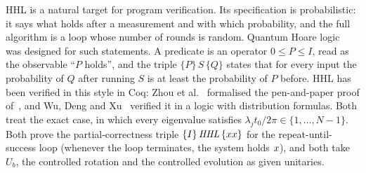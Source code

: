 \documentclass[runningheads]{llncs}
\let\ket\relax\let\bra\relax\let\braket\relax\let\ketbra\relax
\newcommand{\ket}[1]{|#1\rangle}
\newcommand{\bra}[1]{\langle #1|}
\newcommand{\braket}[2]{\langle #1|#2\rangle}
\newcommand{\ketbra}[2]{|#1\rangle\langle #2|}
\begin{document}
HHL is a natural target for program verification. Its specification is probabilistic: it says what
holds after a measurement and with which probability, and the full algorithm is a loop whose number of
rounds is random. Quantum Hoare logic~\cite{ying2011,dhondt2006} was designed for such statements. A
predicate is an operator $0\le P\le I$, read as the observable ``$P$ holds'', and the triple
$\{P\}\,S\,\{Q\}$ states that for every input the probability of $Q$ after running $S$ is at least the
probability of $P$ before. HHL has been verified in this style in Coq: Zhou et al.~\cite{zhou2023coqq}
formalised the pen-and-paper proof of~\cite{zhou2019applied}, and Wu, Deng and Xu~\cite{wu2024local}
verified it in a logic with distribution formulas. Both treat the exact case, in which every
eigenvalue satisfies $\lambda_jt_0/2\pi\in\{1,\dots,N-1\}$. Both prove the partial-correctness
triple $\{I\}\,\mathit{HHL}\,\{\ketbra xx\}$ for the repeat-until-success loop (whenever the loop
terminates, the system holds $\ket x$), and both take $U_b$, the controlled rotation and the controlled
evolution as given unitaries.
\end{document}
